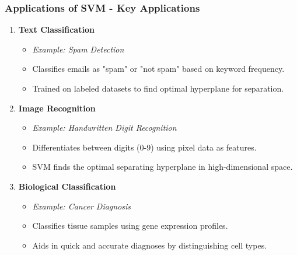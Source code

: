 \documentclass[aspectratio=169]{beamer}
\begin{document}
\begin{frame}[fragile]
    \frametitle{Applications of SVM - Key Applications}
    \begin{enumerate}
        \item \textbf{Text Classification}
        \begin{itemize}
            \item \textit{Example: Spam Detection}
            \item Classifies emails as "spam" or "not spam" based on keyword frequency.
            \item Trained on labeled datasets to find optimal hyperplane for separation.
        \end{itemize}
        
        \item \textbf{Image Recognition}
        \begin{itemize}
            \item \textit{Example: Handwritten Digit Recognition}
            \item Differentiates between digits (0-9) using pixel data as features.
            \item SVM finds the optimal separating hyperplane in high-dimensional space.
        \end{itemize}
        
        \item \textbf{Biological Classification}
        \begin{itemize}
            \item \textit{Example: Cancer Diagnosis}
            \item Classifies tissue samples using gene expression profiles.
            \item Aids in quick and accurate diagnoses by distinguishing cell types.
        \end{itemize}
    \end{enumerate}
\end{frame}
\end{document}

